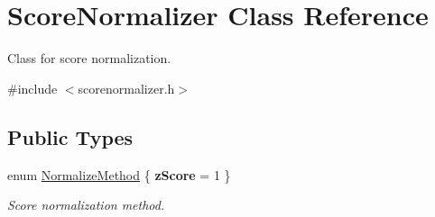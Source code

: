 \hypertarget{class_score_normalizer}{\section{Score\+Normalizer Class Reference}
\label{class_score_normalizer}
}


Class for score normalization.  




{\ttfamily \#include $<$scorenormalizer.\+h$>$}

\subsection*{Public Types}
\begin{DoxyCompactItemize}
\item 
\hypertarget{class_score_normalizer_a815de463ec815b4dcf8f2919da83c7d6}{enum \hyperlink{class_score_normalizer_a815de463ec815b4dcf8f2919da83c7d6}{Normalize\+Method} \{ {\bfseries z\+Score} = 1
 \}}\label{class_score_normalizer_a815de463ec815b4dcf8f2919da83c7d6}

\begin{DoxyCompactList}\small\item\em Score normalization method. \end{DoxyCompactList}\end{DoxyCompactItemize}
